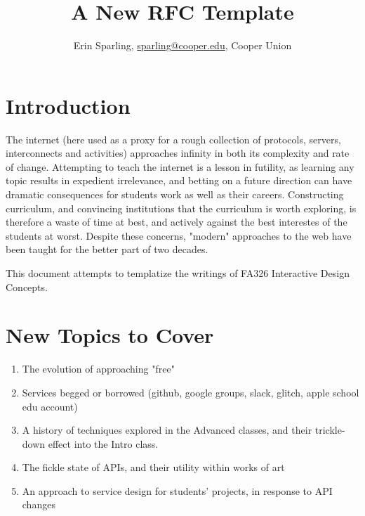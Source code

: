 \documentclass[12pt]{article}
\title{\LARGE A New RFC Template}
\author{Erin Sparling, \href{mailto:sparling@cooper.edu}{sparling@cooper.edu}, Cooper Union}
\begin{document}
\maketitle

\tableofcontents

\thispagestyle{empty}



\newpage

\section{Introduction}

The internet (here used as a proxy for a rough collection of protocols, servers, interconnects and activities) approaches infinity in both its complexity and rate of change. Attempting to teach the internet is a lesson in futility, as learning any topic results in expedient irrelevance, and betting on a future direction can have dramatic consequences for students work as well as their careers. Constructing curriculum, and convincing institutions that the curriculum is worth exploring, is therefore a waste of time at best, and actively against the best interestes of the students at worst. Despite these concerns, "modern" approaches to the web have been taught for the better part of two decades.

This document attempts to templatize the writings of FA326 Interactive Design Concepts.

\section*{New Topics to Cover}

\begin{enumerate}
    \item The evolution of approaching "free" 
    \item Services begged or borrowed (github, google groups, slack, glitch, apple school edu account)
    \item A history of techniques explored in the Advanced classes, and their trickle-down effect into the Intro class.
    \item The fickle state of APIs, and their utility within works of art
    \item An approach to service design for students' projects, in response to API changes
\end{enumerate}
\end{document}
